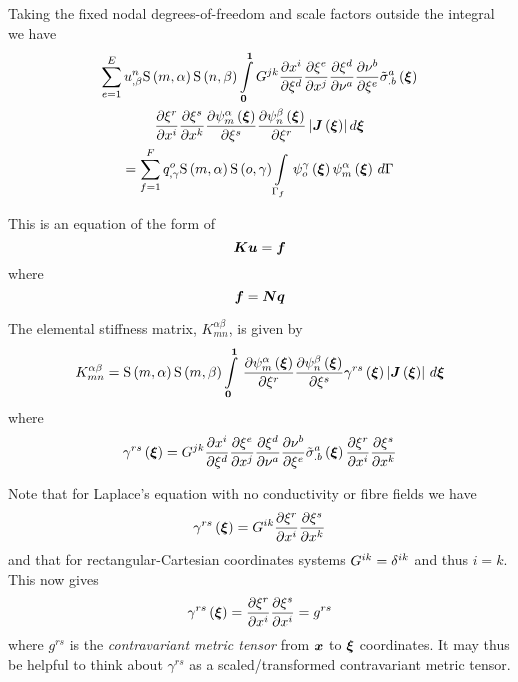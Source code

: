 Taking the fixed nodal degrees-of-freedom and scale factors outside the integral we have
\begin{multline}
  \dsum_{e=1}^{E}\nodedof{u}{n}{\beta}\gsf{m}{\alpha}\gsf{n}{\beta}
  \dintl{\vect{0}}{\vect{1}}G^{jk}\delby{x^{i}}{\xi^{d}}
  \delby{\xi^{e}}{x^{j}}\delby{\xi^{d}}{\nu^{a}}
  \delby{\nu^{b}}{\xi^{e}}\fnof{{\tilde{\sigma}}^{a}_{.b}}{\vect{\xi}} \\
  \delby{\xi^{r}}{x^{i}}\delby{\xi^{s}}{x^{k}}
  \delby{\gbfn{m}{\alpha}{\vect{\xi}}}{\xi^{s}}
  \delby{\gbfn{n}{\beta}{\vect{\xi}}}{\xi^{r}}
  \abs{\fnof{\matr{J}}{\vect{\xi}}}d\vect{\xi} \\
  = \dsum_{f=1}^{F}\nodedof{q}{o}{\gamma}\gsf{m}{\alpha}\gsf{o}{\gamma}
  \gint{\Gamma_{f}}{}{\gbfn{o}{\gamma}{\vect{\xi}}\gbfn{m}{\alpha}{\vect{\xi}}}{\Gamma}
  \label{eqn:elementalfemlhs1}
\end{multline}

This is an equation of the form of
\begin{equation}
  \matr{K}\vect{u}=\vect{f}
\end{equation}
where
\begin{equation}
  \vect{f}=\matr{N}\vect{q}
\end{equation}

The elemental stiffness matrix, $K^{\alpha\beta}_{mn}$, is given by
\begin{equation}
  K^{\alpha\beta}_{mn}=\gsf{m}{\alpha}\gsf{m}{\beta}
  \gint{\vect{0}}{\vect{1}}{\delby{\gbfn{m}{\alpha}{\vect{\xi}}}{\xi^{r}}
    \delby{\gbfn{n}{\beta}{\vect{\xi}}}{\xi^{s}}\fnof{\gamma^{rs}}{\vect{\xi}}
    \abs{\fnof{\matr{J}}{\vect{\xi}}}}{\vect{\xi}}
  \label{eqn:elementalfemlhs2}
\end{equation}
where
\begin{equation}
  \fnof{\gamma^{rs}}{\vect{\xi}}=G^{jk}\delby{x^{i}}{\xi^{d}}
  \delby{\xi^{e}}{x^{j}}\delby{\xi^{d}}{\nu^{a}}\delby{\nu^{b}}{\xi^{e}}
  \fnof{{\tilde{\sigma}}^{a}_{.b}}{\vect{\xi}}\delby{\xi^{r}}{x^{i}}\delby{\xi^{s}}{x^{k}}
  \label{eqn:diffusiongammadefinition1}
\end{equation}

Note that for Laplace's equation with no conductivity or fibre fields we have
\begin{equation}
  \fnof{\gamma^{rs}}{\vect{\xi}}=G^{ik}\delby{\xi^{r}}{x^{i}}\delby{\xi^{s}}{x^{k}}
  \label{eqn:diffusiongammadefinition2}
\end{equation}
and that for rectangular-Cartesian coordinates systems
$G^{ik}=\delta^{{i}{k}}$ and thus $i=k$. This now gives
\begin{equation}
  \fnof{\gamma^{rs}}{\vect{\xi}}=\delby{\xi^{r}}{x^{i}}\delby{\xi^{s}}{x^{i}}=g^{rs}
  \label{eqn:diffusiongammadefinition3}
\end{equation}
where $g^{rs}$ is the \emph{contravariant metric tensor} from $\vect{x}$ to
$\vect{\xi}$ coordinates. It may thus be helpful to think about $\gamma^{rs}$
as a scaled/transformed contravariant metric tensor.

